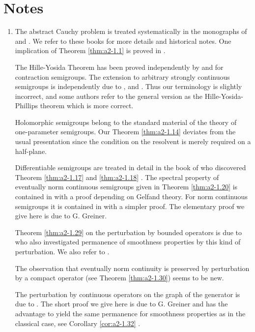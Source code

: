 \section*{Notes}\label{notes:a2-notes}
\begin{enumerate}[label=\emph{Section \arabic*:}, wide, itemsep=1ex]
\item
The abstract Cauchy problem is treated systematically in the monographs of \citet{krein:1971} and \citet{fattorini:1983}.
We refer to these books for more details and historical notes.
One implication of Theorem \ref{thm:a2-1.1}   is proved in \citet[Theorem 2.11]{krein:1971}.

The Hille-Yosida Theorem has been proved independently by \citet{hille:1948} and \citet{yosida:1948} for contraction semigroups.
The extension to arbitrary strongly continuous semigroups is independently due to \citet{feller:1953a}, \citet{miyadera:1952} and \citet{phillips:1954}.
Thus our terminology is slightly incorrect, and some authors refer to the general version as the Hille-Yosida-Phillips theorem which is  more correct.

Holomorphic semigroups belong to the standard material of the theory of one-parameter semigroups.
Our Theorem \ref{thm:a2-1.14}   deviates from the usual presentation since the condition on the resolvent is merely required on a half-plane.

Differentiable semigroups are treated in detail in the book of \citet{pazy:1983} who discovered Theorem \ref{thm:a2-1.17}   and \ref{thm:a2-1.18} . 
The spectral property of eventually norm continuous semigroups given in Theorem \ref{thm:a2-1.20}   is contained in \citet[Theorem 16.4.2]{hillephillips:1957} with a proof depending on Gelfand theory.
For norm continuous semigroups it is contained in \citet{pazy:1983} with a simpler proof.
The elementary proof we give here is due to G. Greiner.

Theorem \ref{thm:a2-1.29}   on the perturbation by bounded operators is due to \citet{phillips:1954} who also investigated permanence of smoothness properties by this kind of perturbation.
We also refer to \citet[Section 3.1]{pazy:1983}.

The observation that eventually norm continuity is preserved by perturbation by a compact operator (see Theorem \ref{thm:a2-1.30}) seems to be new.

The perturbation by continuous operators on the graph of the generator is due to \citet{deschschappacher:1984}.
The short proof we give here is due to G. Greiner and has the advantage to yield the same permanence for smoothness properties as in the classical case, see Corollary \ref{cor:a2-1.32} . 


\end{enumerate}
